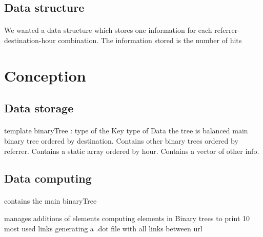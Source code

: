 \documentclass[a4paper, 12pts]{article}
\begin{document}
\subsection{Data structure}
\paragraph{}
 We wanted a data structure which stores one information for each referrer-destination-hour combination.
 The information stored is the number of hits
 
\newpage
 
\section{Conception}
\subsection{Data storage}
\paragraph{}
 template binaryTree :
    type of the Key
    type of Data
    the tree is balanced
main binary tree ordered by destination. Contains other binary trees ordered by referrer. Contains a static array ordered by hour. Contains a vector of other info.
\subsection{Data computing}
\paragraph{}
 contains the main binaryTree

 manages additions of elements
 computing elements in Binary trees to print 10 most used links
 generating a .dot file with all links between url
\end{document}
